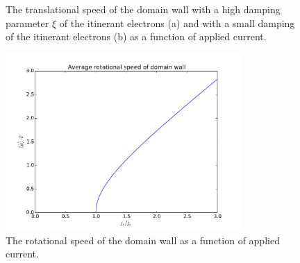 \documentclass[1p]{elsarticle}		%
\numberwithin{equation}{section}
\begin{document}
\begin{figure}[h!]
\begin{subfigure}{.5\textwidth}
  \caption{}
  \label{fig:criticalCurrent}
\end{subfigure}
\caption{The translational speed of the domain wall with a high damping parameter $\xi$ of the itinerant electrons (a) and with a small damping of the itinerant electrons (b) as a function of applied current.}
\label{fig:Xdot_afo_current}
\end{figure}

\begin{figure}[h!]
\begin{center}
\includegraphics[width=0.8\textwidth]{Figures/criticalCurrentPhidot.pdf} 
\caption{The rotational speed of the domain wall as a function of applied current.}
\label{fig:phidot_afo_current} 
\end{center}
\end{figure}
\end{document}
